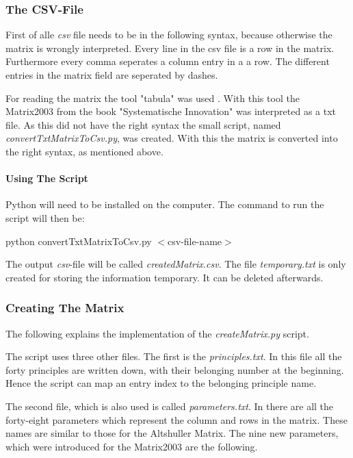 \documentclass[11pt,a4paper]{article}
\begin{document}
\subsubsection{The CSV-File}

First of alle \textit{csv} file needs to be in the following syntax, because
otherwise the matrix is wrongly interpreted.  Every line in the csv file is a
row in the matrix.  Furthermore every comma seperates a column entry in a a
row.  The different entries in the matrix field are seperated by dashes.

For reading the matrix the tool "tabula" was used \cite{tabula}.  With this
tool the Matrix2003 from the book "Systematische Innovation" was interpreted
as a txt file.  As this did not have the right syntax the small script, named
\textit{convertTxtMatrixToCsv.py}, was created.  With this the matrix is
converted into the right syntax, as mentioned above.

\paragraph{Using The Script}

Python will need to be installed on the computer.  The command to run the
script will then be:

\begin{center}
  python convertTxtMatrixToCsv.py $<$csv-file-name$>$
\end{center}

The output \textit{csv}-file will be called \textit{createdMatrix.csv}.  The
file \textit{temporary.txt} is only created for storing the information
temporary.  It can be deleted afterwards.

\subsubsection{Creating The Matrix}
\label{subsubsec:creating_matrix}

The following explains the implementation of the \textit{createMatrix.py}
script.

The script uses three other files.  The first is the \textit{principles.txt}.
In this file all the forty principles are written down, with their belonging
number at the beginning.  Hence the script can map an entry index to the
belonging principle name.

The second file, which is also used is called \textit{parameters.txt}.  In
there are all the forty-eight parameters which represent the column and rows
in the matrix.  These names are similar to those for the Altshuller Matrix.
The nine new parameters, which were introduced for the Matrix2003 are the
following.
\end{document}
